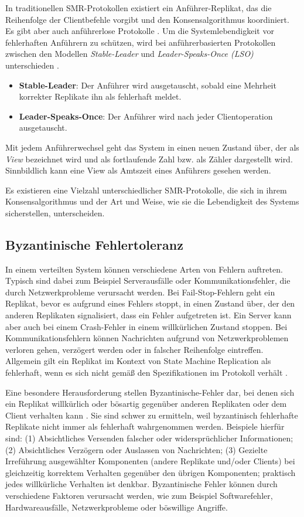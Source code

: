 \documentclass[nonacm,sigconf,natbib=false]{acmart}
\begin{document}
In traditionellen SMR-Protokollen existiert ein Anführer-Replikat, das die Reihenfolge der Clientbefehle vorgibt und den Konsensalgorithmus koordiniert. Es gibt aber auch anführerlose Protokolle \cite{smr-leaderless}. Um die Systemlebendigkeit vor fehlerhaften Anführern zu schützen, wird bei anführerbasierten Protokollen zwischen den Modellen \emph{Stable-Leader} und \emph{Leader-Speaks-Once (LSO)} unterschieden \cite{beegees}.
\begin{itemize}
  \item \textbf{Stable-Leader}: Der Anführer wird ausgetauscht, sobald eine Mehrheit korrekter Replikate ihn als fehlerhaft meldet.
  \item \textbf{Leader-Speaks-Once}: Der Anführer wird nach jeder Clientoperation ausgetauscht.
\end{itemize}
Mit jedem Anführerwechsel geht das System in einen neuen Zustand über, der als \emph{View} bezeichnet wird und als fortlaufende Zahl bzw. als Zähler dargestellt wird. Sinnbildlich kann eine View als Amtszeit eines Anführers gesehen werden.

Es existieren eine Vielzahl unterschiedlicher SMR-Protokolle, die sich in ihrem Konsensalgorithmus und der Art und Weise, wie sie die Lebendigkeit des Systems sicherstellen, unterscheiden.

\subsection{Byzantinische Fehlertoleranz}

In einem verteilten System können verschiedene Arten von Fehlern auftreten. Typisch sind dabei zum Beispiel Serverausfälle oder Kommunikationsfehler, die durch Netzwerkprobleme verursacht werden. Bei Fail-Stop-Fehlern geht ein Replikat, bevor es aufgrund eines Fehlers stoppt, in einen Zustand über, der den anderen Replikaten signalisiert, dass ein Fehler aufgetreten ist. Ein Server kann aber auch bei einem Crash-Fehler in einem willkürlichen Zustand stoppen. Bei Kommunikationsfehlern können Nachrichten aufgrund von Netzwerkproblemen verloren gehen, verzögert werden oder in falscher Reihenfolge eintreffen. Allgemein gilt ein Replikat im Kontext von State Machine Replication als fehlerhaft, wenn es sich nicht gemäß den Spezifikationen im Protokoll verhält \cite{smr-schneider}.

Eine besondere Herausforderung stellen Byzantinische-Fehler dar, bei denen sich ein Replikat willkürlich oder bösartig gegenüber anderen Replikaten oder dem Client verhalten kann \cite{smr-schneider}. Sie sind schwer zu ermitteln, weil byzantinisch fehlerhafte Replikate nicht immer als fehlerhaft wahrgenommen werden. Beispiele hierfür sind: (1) Absichtliches Versenden falscher oder widersprüchlicher Informationen; (2) Absichtliches Verzögern oder Auslassen von Nachrichten; (3) Gezielte Irreführung ausgewählter Komponenten (andere Replikate und/oder Clients) bei gleichzeitig korrektem Verhalten gegenüber den übrigen Komponenten; praktisch jedes willkürliche Verhalten ist denkbar. Byzantinische Fehler können durch verschiedene Faktoren verursacht werden, wie zum Beispiel Softwarefehler, Hardwareausfälle, Netzwerkprobleme oder böswillige Angriffe.
\end{document}
